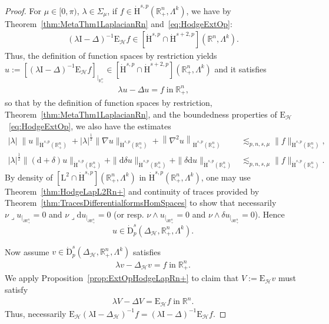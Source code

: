 \documentclass[AHL,Unicode,longabstracts,published]{cedram}
\newcommand{\bbR}{\mathbb{R}}
\newcommand{\rmH}{\mathrm{H}}%
\newcommand{\rmd}{\mathrm{d}}
\newcommand{\rmD}{\mathrm{D}}
\newcommand{\rmL}{\mathrm{L}}
\newcommand{\rmE}{\mathrm{E}}
\newcommand{\rmI}{\mathrm{I}}
\newcommand{\clH}{\mathcal{H}}
\newcommand{\iprod}{\mathbin{\lrcorner}}
\begin{document}
\begin{proof}
For $\mu\in[0,\pi)$, $\lambda\in\Sigma_\mu$, if $f\in \dot{\rmH}^{s,p}(\bbR^n_+,\Lambda^k)$, we have by Theorem~\ref{thm:MetaThm1LaplacianRn} and~\eqref{eq:HodgeExtOp}:
\begin{align*}
(\lambda \rmI -\Delta)^{-1}\rmE_{\clH}f \in \left[\dot{\rmH}^{s,p}\cap\dot{\rmH}^{s+2,p}\right]\left(\bbR^n,\Lambda^k\right).
\end{align*}
Thus, the definition of function spaces by restriction yields $u:= [(\lambda \rmI -\Delta)^{-1}\rmE _{\clH}f]_{|_{\bbR^n_+}}\in [\dot{\rmH}^{s,p}\cap\dot{\rmH}^{s+2,p}](\bbR^n_+,\Lambda^k)$ and it satisfies
\begin{align*}
\lambda u -\Delta u =f \;\text{in}\; \bbR^n_+ \text{,}
\end{align*}
so that by the definition of function spaces by restriction, Theorem~\ref{thm:MetaThm1LaplacianRn}, and the boundedness properties of $\rmE_{\clH}$~\eqref{eq:HodgeExtOp}, we also have the estimates
\begin{align*}
|\lambda|\;\| u\|_{\dot{\rmH}^{s,p}\left(\bbR^n_+\right)}+|\lambda|^\frac{1}{2}\| \nabla u\|_{\dot{\rmH}^{s,p}\left(\bbR^n_+\right)}+\left\| \nabla^2 u\right\|_{\dot{\rmH}^{s,p}\left(\bbR^n_+\right)} &\lesssim_{p,n,s,\mu} \| f\|_{\dot{\rmH}^{s,p}\left(\bbR^n_+\right)} ,\\
|\lambda|^\frac{1}{2}\| (\rmd+\delta) u\|_{\dot{\rmH}^{s,p}\left(\bbR^n_+\right)}+\| \rmd\delta u\|_{\dot{\rmH}^{s,p}\left(\bbR^n_+\right)} + \| \delta\rmd u\|_{\dot{\rmH}^{s,p}\left(\bbR^n_+\right)} &\lesssim_{p,n,s,\mu} \| f\|_{\dot{\rmH}^{s,p}\left(\bbR^n_+\right)} .
\end{align*}
By density of $[\rmL^2\cap\dot{\rmH}^{s,p}](\bbR^n_+,\Lambda^k)$ in $\dot{\rmH}^{s,p}(\bbR^n_+,\Lambda^k)$, one may use Theorem~\ref{thm:HodgeLapL2Rn+} and continuity of traces provided by Theorem~\ref{thm:TracesDifferentialformsHomSpaces} to show that necessarily $\nu\iprod u_{|_{\partial\bbR^n_+}}=0$ and $\nu\iprod \rmd u_{|_{\partial\bbR^n_+}}=0$ (or resp. $\nu\wedge u_{|_{\partial\bbR^n_+}}=0$ and $\nu\wedge \delta u_{|_{\partial\bbR^n_+}}=0$). Hence
\[
u\in \dot{\rmD}^{s}_{p}\left(\Delta_{\clH},\bbR^n_+,\Lambda^k\right).
\]

Now assume $v\in \dot{\rmD}^{s}_{p}(\Delta_{\clH},\bbR^n_+,\Lambda^k)$ satisfies
\begin{align*}
\lambda v -\Delta_\clH v =f \;\text{in}\; \bbR^n_+.
\end{align*}
We apply Proposition~\ref{prop:ExtOpHodgeLapRn+} to claim that $V:=\rmE _\clH v$ must satisfy
\begin{align*}
\lambda V -\Delta V = \rmE _{\clH}f \;\text{in}\; \bbR^n.
\end{align*}
Thus, necessarily $\rmE _{\clH}(\lambda \rmI  - \Delta_{\clH})^{-1}f = (\lambda \rmI  - \Delta)^{-1}\rmE_{\clH}f$.



\end{proof}
\end{document}
